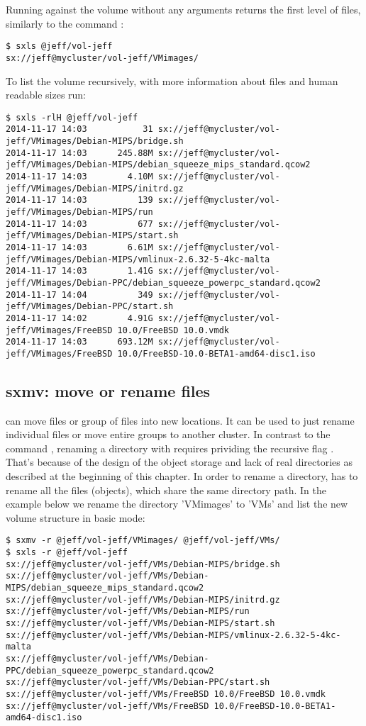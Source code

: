 Running  against the volume without any arguments returns the first
level of files, similarly to the command :
\begin{lstlisting}
$ sxls @jeff/vol-jeff
sx://jeff@mycluster/vol-jeff/VMimages/
\end{lstlisting}
To list the volume recursively, with more information about files and human
readable sizes run:
\begin{lstlisting}
$ sxls -rlH @jeff/vol-jeff
2014-11-17 14:03           31 sx://jeff@mycluster/vol-jeff/VMimages/Debian-MIPS/bridge.sh
2014-11-17 14:03      245.88M sx://jeff@mycluster/vol-jeff/VMimages/Debian-MIPS/debian_squeeze_mips_standard.qcow2
2014-11-17 14:03        4.10M sx://jeff@mycluster/vol-jeff/VMimages/Debian-MIPS/initrd.gz
2014-11-17 14:03          139 sx://jeff@mycluster/vol-jeff/VMimages/Debian-MIPS/run
2014-11-17 14:03          677 sx://jeff@mycluster/vol-jeff/VMimages/Debian-MIPS/start.sh
2014-11-17 14:03        6.61M sx://jeff@mycluster/vol-jeff/VMimages/Debian-MIPS/vmlinux-2.6.32-5-4kc-malta
2014-11-17 14:03        1.41G sx://jeff@mycluster/vol-jeff/VMimages/Debian-PPC/debian_squeeze_powerpc_standard.qcow2
2014-11-17 14:04          349 sx://jeff@mycluster/vol-jeff/VMimages/Debian-PPC/start.sh
2014-11-17 14:02        4.91G sx://jeff@mycluster/vol-jeff/VMimages/FreeBSD 10.0/FreeBSD 10.0.vmdk
2014-11-17 14:03      693.12M sx://jeff@mycluster/vol-jeff/VMimages/FreeBSD 10.0/FreeBSD-10.0-BETA1-amd64-disc1.iso
\end{lstlisting}

\subsection{sxmv: move or rename files}
 can move files or group of files into new locations. It can be
used to just rename individual files or move entire groups to another cluster.
In contrast to the command , renaming a directory with 
requires prividing the recursive flag . That's because of the design
of the object storage and lack of real directories as described at the beginning
of this chapter. In order to rename a directory,  has to rename all the
files (objects), which share the same directory path. In the example below we rename
the directory 'VMimages' to 'VMs' and list the new volume structure in basic mode:
\begin{lstlisting}
$ sxmv -r @jeff/vol-jeff/VMimages/ @jeff/vol-jeff/VMs/
$ sxls -r @jeff/vol-jeff
sx://jeff@mycluster/vol-jeff/VMs/Debian-MIPS/bridge.sh
sx://jeff@mycluster/vol-jeff/VMs/Debian-MIPS/debian_squeeze_mips_standard.qcow2
sx://jeff@mycluster/vol-jeff/VMs/Debian-MIPS/initrd.gz
sx://jeff@mycluster/vol-jeff/VMs/Debian-MIPS/run
sx://jeff@mycluster/vol-jeff/VMs/Debian-MIPS/start.sh
sx://jeff@mycluster/vol-jeff/VMs/Debian-MIPS/vmlinux-2.6.32-5-4kc-malta
sx://jeff@mycluster/vol-jeff/VMs/Debian-PPC/debian_squeeze_powerpc_standard.qcow2
sx://jeff@mycluster/vol-jeff/VMs/Debian-PPC/start.sh
sx://jeff@mycluster/vol-jeff/VMs/FreeBSD 10.0/FreeBSD 10.0.vmdk
sx://jeff@mycluster/vol-jeff/VMs/FreeBSD 10.0/FreeBSD-10.0-BETA1-amd64-disc1.iso
\end{lstlisting}

